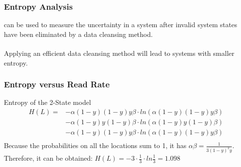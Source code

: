
\begin{frame}
\frametitle{Entropy Analysis}

 can be used to measure the uncertainty in a system after invalid system states have been eliminated by a data cleansing method.\\~\\

Applying an efficient data cleansing method will lead to systems with smaller entropy.

\end{frame}


\begin{frame}
\frametitle{Entropy versus Read Rate}



\begin{block}{Entropy of the 2-State model}
  \begin{equation}
    \begin{split}
      H(L) = & - \alpha(1-y)(1-y)y\beta \cdot ln(\alpha(1-y)(1-y)y\beta) \\
             & - \alpha(1-y)y(1-y)\beta \cdot ln(\alpha(1-y)y(1-y)\beta) \\
             & - \alpha(1-y)(1-y)y\beta \cdot ln(\alpha(1-y)(1-y)y\beta) \\
    \end{split}
  \end{equation}
  Because the probabilities on all the locations sum to 1, it has $\alpha\beta = \frac{1}{3(1-y)^2y}$. Therefore, it can be obtained: $  H(L) = -3 \cdot \frac{1}{3} \cdot ln\frac{1}{3} = 1.098 $
\end{block}
\end{frame}

